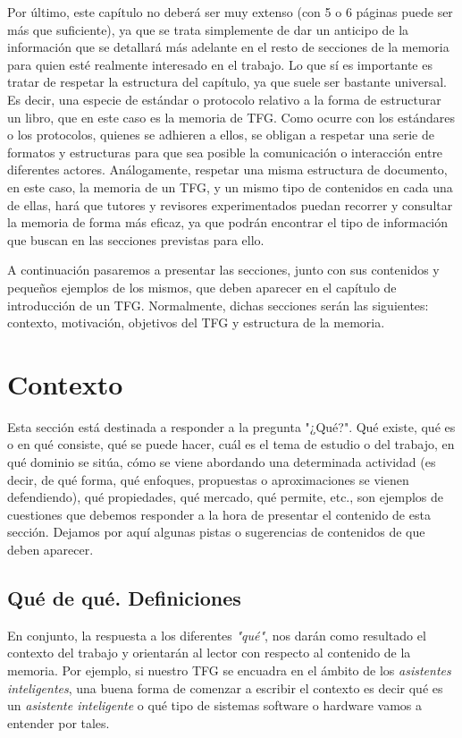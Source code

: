 Por último, este capítulo no deberá ser muy extenso (con 5 o 6 páginas puede ser más que suficiente), ya que se trata simplemente de dar un anticipo de la información que se detallará más adelante en el resto de secciones de la memoria para quien esté realmente interesado en el trabajo. Lo que sí es importante es tratar de respetar la estructura del capítulo, ya que suele ser bastante universal. Es decir, una especie de estándar o protocolo relativo a la forma de estructurar un libro, que en este caso es la memoria de TFG. Como ocurre con los estándares o los protocolos, quienes se adhieren a ellos, se obligan a respetar una serie de formatos y estructuras para que sea posible la comunicación o interacción entre diferentes actores. Análogamente, respetar una misma estructura de documento, en este caso, la memoria de un TFG, y un mismo tipo de contenidos en cada una de ellas, hará que tutores y revisores experimentados puedan recorrer y consultar la memoria de forma más eficaz, ya que podrán encontrar el tipo de información que buscan en las secciones previstas para ello.

A continuación pasaremos a presentar las secciones, junto con sus contenidos y pequeños ejemplos de los mismos, que deben aparecer en el capítulo de introducción de un TFG. Normalmente, dichas secciones serán las siguientes: contexto, motivación, objetivos del TFG y estructura de la memoria.

\section{Contexto}\label{Contexto}
Esta sección está destinada a responder a la pregunta "¿Qué?". Qué existe, qué es o en qué consiste, qué se puede hacer, cuál es el tema de estudio o del trabajo, en qué dominio se sitúa, cómo se viene abordando una determinada actividad (es decir, de qué forma, qué enfoques, propuestas o aproximaciones se vienen defendiendo), qué propiedades, qué mercado, qué permite, etc., son ejemplos de cuestiones que debemos responder a la hora de presentar el contenido de esta sección. Dejamos por aquí algunas pistas o sugerencias de contenidos de que deben aparecer.

\subsection{Qué de qué. Definiciones}

En conjunto, la respuesta a los diferentes \textit{"qué"}, nos darán como resultado el contexto del trabajo y orientarán al lector con respecto al contenido de la memoria. Por ejemplo, si nuestro TFG se encuadra en el ámbito de los \textit{asistentes inteligentes}, una buena forma de comenzar a escribir el contexto es decir qué es un \textit{asistente inteligente} o qué tipo de sistemas software o hardware vamos a entender por tales.

